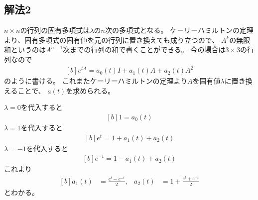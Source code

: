 \documentclass[../ap_2014.tex]{subfiles}
\begin{document}
\subsection*{解法2}
\(n\times n\)の行列の固有多項式は\(\lambda\)の\(n\)次の多項式となる。
ケーリーハミルトンの定理より、固有多項式の固有値を元の行列に置き換えても成り立つので、
\(A^k\)の無限和というのは\(A^{n-1}\)次までの行列の和で書くことができる。
今の場合は\(3\times3\)の行列なので
\begin{equation}\begin{aligned}[b]
    e^{tA} = a_0(t)I + a_1(t)A + a_2(t)A^2
\end{aligned}\end{equation}
のように書ける。
これまたケーリーハミルトンの定理より\(A\)を固有値\(\lambda\)に置き換えることで、
\(a(t)\)を求められる。

\(\lambda=0\)を代入すると
\begin{equation}\begin{aligned}[b]
    1 = a_0(t)
\end{aligned}\end{equation}
\(\lambda=1\)を代入すると
\begin{equation}\begin{aligned}[b]
    e^t = 1 + a_1(t) +a_2(t)
\end{aligned}\end{equation}
\(\lambda=-1\)を代入すると
\begin{equation}\begin{aligned}[b]
    e^{-t} = 1 -a_1(t)+a_2(t)
\end{aligned}\end{equation}
これより
\begin{equation}\begin{aligned}[b]
    a_1(t) &= \frac{e^{t}-e^{-t}}{2}, & a_2(t) &= 1+\frac{e^{t}+e^{-t}}{2}
\end{aligned}\end{equation}
とわかる。
\end{document}
